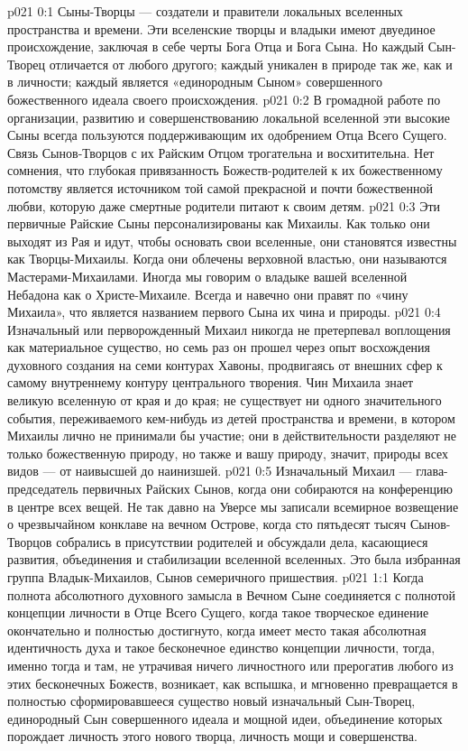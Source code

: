 \author{Совершенствователь Мудрости}
\vs p021 0:1 Сыны\hyp{}Творцы --- создатели и правители локальных вселенных пространства и времени. Эти вселенские творцы и владыки имеют двуединое происхождение, заключая в себе черты Бога Отца и Бога Сына. Но каждый Сын\hyp{}Творец отличается от любого другого; каждый уникален в природе так же, как и в личности; каждый является «единородным Сыном» совершенного божественного идеала своего происхождения.
\vs p021 0:2 В громадной работе по организации, развитию и совершенствованию локальной вселенной эти высокие Сыны всегда пользуются поддерживающим их одобрением Отца Всего Сущего. Связь Сынов\hyp{}Творцов с их Райским Отцом трогательна и восхитительна. Нет сомнения, что глубокая привязанность Божеств\hyp{}родителей к их божественному потомству является источником той самой прекрасной и почти божественной любви, которую даже смертные родители питают к своим детям.
\vs p021 0:3 Эти первичные Райские Сыны персонализированы как Михаилы. Как только они выходят из Рая и идут, чтобы основать свои вселенные, они становятся известны как Творцы\hyp{}Михаилы. Когда они облечены верховной властью, они называются Мастерами\hyp{}Михаилами. Иногда мы говорим о владыке вашей вселенной Небадона как о Христе\hyp{}Михаиле. Всегда и навечно они правят по «чину Михаила», что является названием первого Сына их чина и природы.
\vs p021 0:4 \pc Изначальный или перворожденный Михаил никогда не претерпевал воплощения как материальное существо, но семь раз он прошел через опыт восхождения духовного создания на семи контурах Хавоны, продвигаясь от внешних сфер к самому внутреннему контуру центрального творения. Чин Михаила знает великую вселенную от края и до края; не существует ни одного значительного события, переживаемого кем\hyp{}нибудь из детей пространства и времени, в котором Михаилы лично не принимали бы участие; они в действительности разделяют не только божественную природу, но также и вашу природу, значит, природы всех видов --- от наивысшей до наинизшей.
\vs p021 0:5 Изначальный Михаил --- глава\hyp{}председатель первичных Райских Сынов, когда они собираются на конференцию в центре всех вещей. Не так давно на Уверсе мы записали всемирное возвещение о чрезвычайном конклаве на вечном Острове, когда сто пятьдесят тысяч Сынов\hyp{}Творцов собрались в присутствии родителей и обсуждали дела, касающиеся развития, объединения и стабилизации вселенной вселенных. Это была избранная группа Владык\hyp{}Михаилов, Сынов семеричного пришествия.
\vs p021 1:1 Когда полнота абсолютного духовного замысла в Вечном Сыне соединяется с полнотой концепции личности в Отце Всего Сущего, когда такое творческое единение окончательно и полностью достигнуто, когда имеет место такая абсолютная идентичность духа и такое бесконечное единство концепции личности, тогда, именно тогда и там, не утрачивая ничего личностного или прерогатив любого из этих бесконечных Божеств, возникает, как вспышка, и мгновенно превращается в полностью сформировавшееся существо новый изначальный Сын\hyp{}Творец, единородный Сын совершенного идеала и мощной идеи, объединение которых порождает личность этого нового творца, личность мощи и совершенства.
